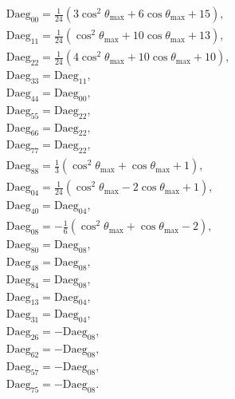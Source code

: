 \documentclass[a4paper,11pt,twoside,openright]{book}
\def\lthtmlcheckvsize{\ifdim\ht\sizebox<\vsize 
  \ifdim\wd\sizebox<\hsize\expandafter\hfill\fi \expandafter\vfill
  \else\expandafter\vss\fi}%
\begin{document}
{\newpage\clearpage
\setcounter{equation}{30}
%
\begin{subequations}\begin{align}
&\textrm{Daeg}_{00} = \tfrac{1}{24} \left( 3\cos^2\theta_{\textrm{max}}+ 6\cos\theta_{\textrm{max}}+ 15 \right), \\
&\textrm{Daeg}_{11} = \tfrac{1}{24} \left( \cos^2\theta_{\textrm{max}}+ 10\cos\theta_{\textrm{max}}+ 13 \right) , \\
&\textrm{Daeg}_{22} = \tfrac{1}{24} \left( 4\cos^2\theta_{\textrm{max}}+ 10\cos\theta_{\textrm{max}}+ 10 \right) , \\
&\textrm{Daeg}_{33} = \textrm{Daeg}_{11} , \\
&\textrm{Daeg}_{44} = \textrm{Daeg}_{00} , \\
&\textrm{Daeg}_{55} = \textrm{Daeg}_{22} , \\
&\textrm{Daeg}_{66} = \textrm{Daeg}_{22} , \\
&\textrm{Daeg}_{77} = \textrm{Daeg}_{22} , \\
&\textrm{Daeg}_{88} = \tfrac{1}{3} \left( \cos^2\theta_{\textrm{max}}+ \cos\theta_{\textrm{max}}+ 1 \right), \\
&\textrm{Daeg}_{04} = \tfrac{1}{24} \left( \cos^2\theta_{\textrm{max}}- 2\cos\theta_{\textrm{max}}+ 1 \right) , \\
&\textrm{Daeg}_{40} = \textrm{Daeg}_{04} , \\
&\textrm{Daeg}_{08} = -\tfrac{1}{6} \left( \cos^2\theta_{\textrm{max}}+ \cos\theta_{\textrm{max}}- 2 \right) , \\
&\textrm{Daeg}_{80} = \textrm{Daeg}_{08} , \\
&\textrm{Daeg}_{48} = \textrm{Daeg}_{08} , \\
&\textrm{Daeg}_{84} = \textrm{Daeg}_{08} , \\
&\textrm{Daeg}_{13} = \textrm{Daeg}_{04} , \\
&\textrm{Daeg}_{31} = \textrm{Daeg}_{04} , \\
&\textrm{Daeg}_{26} = -\textrm{Daeg}_{08} , \\
&\textrm{Daeg}_{62} = -\textrm{Daeg}_{08} , \\
&\textrm{Daeg}_{57} = -\textrm{Daeg}_{08} , \\
&\textrm{Daeg}_{75} = -\textrm{Daeg}_{08} .
\end{align}\end{subequations}%
\lthtmldisplayZ
\lthtmlcheckvsize\clearpage}
\end{document}

